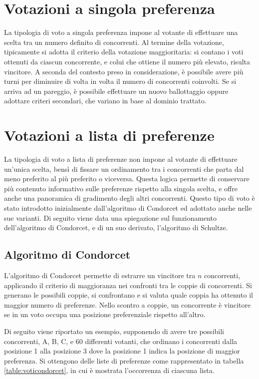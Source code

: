 \documentclass[12pt,a4paper,openright,twoside]{book}
\begin{document}
\section{Votazioni a singola preferenza}
La tipologia di voto a singola preferenza impone al votante di effettuare una scelta tra un
numero definito di concorrenti. Al termine della votazione, tipicamente si adotta il criterio
della votazione maggioritaria: si contano i voti ottenuti da ciascun concorrente, e colui che ottiene il
numero più elevato, risulta vincitore. A seconda del contesto preso in considerazione,
è possibile avere più turni per diminuire di volta in volta il numero di concorrenti coinvolti.
Se si arriva ad un pareggio, è possibile effettuare un nuovo ballottaggio oppure adottare
criteri secondari, che variano in base al dominio trattato.
\section{Votazioni a lista di preferenze}
\label{chapter:votazionilistapreferenze}
La tipologia di voto a lista di preferenze non impone al votante di effettuare un'unica scelta,
bensì di fissare un ordinamento tra i concorrenti che parta dal meno preferito al più preferito
o viceversa. Questa logica permette di conservare più contenuto informativo sulle preferenze
rispetto alla singola scelta, e offre anche una panoramica di gradimento degli altri concorrenti.
Questo tipo di voto è stato introdotto inizialmente dall'algoritmo di Condorcet ed adottato
anche nelle sue varianti. Di seguito viene data una spiegazione sul funzionamento dell'algoritmo
di Condorcet, e di un suo derivato, l'algoritmo di Schultze.
\subsection{Algoritmo di Condorcet}
L'algoritmo di Condorcet permette di estrarre un vincitore tra ${n}$ concorrenti,
applicando il criterio di maggioranza nei confronti tra le coppie di concorrenti.
Si generano le possibili coppie, si confrontano e si valuta quale coppia ha ottenuto il
maggior numero di preferenze. Nello scontro a coppie, un concorrente è vincitore se in un
voto occupa una posizione preferenziale rispetto all'altro.

Di seguito viene riportato un esempio, supponendo di avere tre possibili concorrenti, A, B, C,
e 60 differenti votanti, che ordinano i concorrenti dalla posizione 1 alla posizione 3 dove la posizione 1 
indica la posizione di maggior preferenza.
Si ottengono delle liste di preferenze come rappresentato in tabella \ref{table:voticondorcet}, in cui
è mostrata l'occorrenza di ciascuna lista.
\end{document}
